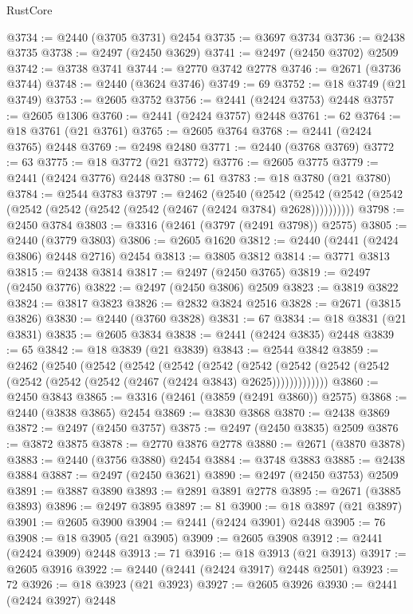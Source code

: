 \begin{lexlean}{RustCore}
\begin{coremodule}
@3734 := @2440 (@3705 @3731) @2454
@3735 := @3697 @3734
@3736 := @2438 @3735
@3738 := @2497 (@2450 @3629)
@3741 := @2497 (@2450 @3702) @2509
@3742 := @3738 @3741
@3744 := @2770 @3742 @2778
@3746 := @2671 (@3736 @3744)
@3748 := @2440 (@3624 @3746)
@3749 := 69
@3752 := @18 @3749 (@21 @3749)
@3753 := @2605 @3752
@3756 := @2441 (@2424 @3753) @2448
@3757 := @2605 @1306
@3760 := @2441 (@2424 @3757) @2448
@3761 := 62
@3764 := @18 @3761 (@21 @3761)
@3765 := @2605 @3764
@3768 := @2441 (@2424 @3765) @2448
@3769 := @2498 @2480
@3771 := @2440 (@3768 @3769)
@3772 := 63
@3775 := @18 @3772 (@21 @3772)
@3776 := @2605 @3775
@3779 := @2441 (@2424 @3776) @2448
@3780 := 61
@3783 := @18 @3780 (@21 @3780)
@3784 := @2544 @3783
@3797 := @2462
    (@2540
      (@2542 (@2542 (@2542 (@2542 (@2542 (@2542 (@2542 (@2542 (@2467 (@2424 @3784) @2628))))))))))
@3798 := @2450 @3784
@3803 := @3316 (@2461 (@3797 (@2491 @3798)) @2575)
@3805 := @2440 (@3779 @3803)
@3806 := @2605 @1620
@3812 := @2440 (@2441 (@2424 @3806) @2448 @2716) @2454
@3813 := @3805 @3812
@3814 := @3771 @3813
@3815 := @2438 @3814
@3817 := @2497 (@2450 @3765)
@3819 := @2497 (@2450 @3776)
@3822 := @2497 (@2450 @3806) @2509
@3823 := @3819 @3822
@3824 := @3817 @3823
@3826 := @2832 @3824 @2516
@3828 := @2671 (@3815 @3826)
@3830 := @2440 (@3760 @3828)
@3831 := 67
@3834 := @18 @3831 (@21 @3831)
@3835 := @2605 @3834
@3838 := @2441 (@2424 @3835) @2448
@3839 := 65
@3842 := @18 @3839 (@21 @3839)
@3843 := @2544 @3842
@3859 := @2462
    (@2540
      (@2542
        (@2542
          (@2542
            (@2542
              (@2542
                (@2542 (@2542 (@2542 (@2542 (@2542 (@2542 (@2467 (@2424 @3843) @2625)))))))))))))
@3860 := @2450 @3843
@3865 := @3316 (@2461 (@3859 (@2491 @3860)) @2575)
@3868 := @2440 (@3838 @3865) @2454
@3869 := @3830 @3868
@3870 := @2438 @3869
@3872 := @2497 (@2450 @3757)
@3875 := @2497 (@2450 @3835) @2509
@3876 := @3872 @3875
@3878 := @2770 @3876 @2778
@3880 := @2671 (@3870 @3878)
@3883 := @2440 (@3756 @3880) @2454
@3884 := @3748 @3883
@3885 := @2438 @3884
@3887 := @2497 (@2450 @3621)
@3890 := @2497 (@2450 @3753) @2509
@3891 := @3887 @3890
@3893 := @2891 @3891 @2778
@3895 := @2671 (@3885 @3893)
@3896 := @2497 @3895
@3897 := 81
@3900 := @18 @3897 (@21 @3897)
@3901 := @2605 @3900
@3904 := @2441 (@2424 @3901) @2448
@3905 := 76
@3908 := @18 @3905 (@21 @3905)
@3909 := @2605 @3908
@3912 := @2441 (@2424 @3909) @2448
@3913 := 71
@3916 := @18 @3913 (@21 @3913)
@3917 := @2605 @3916
@3922 := @2440 (@2441 (@2424 @3917) @2448 @2501)
@3923 := 72
@3926 := @18 @3923 (@21 @3923)
@3927 := @2605 @3926
@3930 := @2441 (@2424 @3927) @2448

\end{coremodule}
\end{lexlean}
